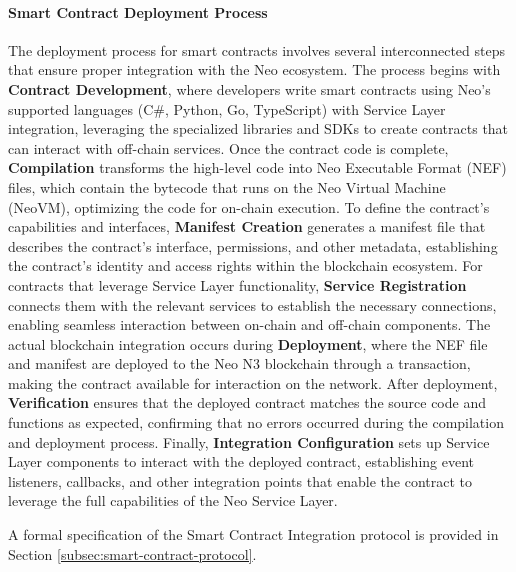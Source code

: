 \documentclass{article}
\begin{document}
\paragraph{Smart Contract Deployment Process}
The deployment process for smart contracts involves several interconnected steps that ensure proper integration with the Neo ecosystem. The process begins with \textbf{Contract Development}, where developers write smart contracts using Neo's supported languages (C\#, Python, Go, TypeScript) with Service Layer integration, leveraging the specialized libraries and SDKs to create contracts that can interact with off-chain services. Once the contract code is complete, \textbf{Compilation} transforms the high-level code into Neo Executable Format (NEF) files, which contain the bytecode that runs on the Neo Virtual Machine (NeoVM), optimizing the code for on-chain execution. To define the contract's capabilities and interfaces, \textbf{Manifest Creation} generates a manifest file that describes the contract's interface, permissions, and other metadata, establishing the contract's identity and access rights within the blockchain ecosystem. For contracts that leverage Service Layer functionality, \textbf{Service Registration} connects them with the relevant services to establish the necessary connections, enabling seamless interaction between on-chain and off-chain components. The actual blockchain integration occurs during \textbf{Deployment}, where the NEF file and manifest are deployed to the Neo N3 blockchain through a transaction, making the contract available for interaction on the network. After deployment, \textbf{Verification} ensures that the deployed contract matches the source code and functions as expected, confirming that no errors occurred during the compilation and deployment process. Finally, \textbf{Integration Configuration} sets up Service Layer components to interact with the deployed contract, establishing event listeners, callbacks, and other integration points that enable the contract to leverage the full capabilities of the Neo Service Layer.

A formal specification of the Smart Contract Integration protocol is provided in Section \ref{subsec:smart-contract-protocol}.


\end{document}
